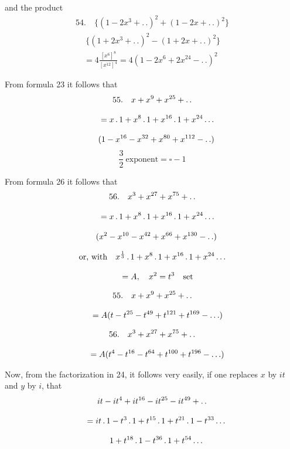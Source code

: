 and the product
\[
\begin{gathered}
54.\quad{}
\{(1-2x^3+ .\,. )^2+(1-2x+ .\,. )^2\}\\[8pt]\quad{}\ \{(1+2x^3+ .\,. )^2-(1+2x+ .\,. )^2\}\\[8pt]
\quad=4\frac{[x^6]^8}{[x^{12}]^4}=4(1-2x^6+2x^{24}- .\,. )^2
\end{gathered}
\]


From formula 23 it follows that
\[
\begin{gathered}55.\quad{}
x+x^9+x^{25}+ .\,. \\[8pt]\quad{}=x\,.\,1+x^8\,.\,1+x^{16}\,.\,1+x^{24}\mathinner{.\,.\,.}\\[8pt]\quad{}(1-x^{16}-x^{32}+x^{80}+x^{112}- .\,. )\end{gathered}
\]
\[
\frac32\ \text{exponent}=\square-1
\]


From formula 26 it follows that
\[
\begin{gathered}56.\quad{}
x^3+x^{27}+x^{75}+ .\,. \\[8pt]\quad{}=x\,.\,1+x^8\,.\,1+x^{16}\,.\,1+x^{24}\mathinner{.\,.\,.}\\[8pt]\quad{}(x^2-x^{10}-x^{42}+x^{66}+x^{130}- .\,. )\end{gathered}
\]

\[
\begin{gathered}\text{or, with}\quad x^{\frac13}\,.\,1+x^8\,.\,1+x^{16}\,.\,1+x^{24}\mathinner{.\,.\,.}\\[8pt]\quad{}=A,\quad x^2=t^3\quad\text{set}\end{gathered}
\]

\[
\begin{gathered}55.\quad{}
x+x^9+x^{25}+ .\,. \\[8pt]\quad{}=A(t-t^{25}-t^{49}+t^{121}+t^{169}-\mathinner{.\,.\,.})\end{gathered}
\]

\[
\begin{gathered}56.\quad{}
x^3+x^{27}+x^{75}+ .\,. \\[8pt]\quad{}=A(t^4-t^{16}-t^{64}+t^{100}+t^{196}-\mathinner{.\,.\,.})\end{gathered}
\]


Now, from the factorization in 24, it follows very easily, if one replaces \(x\) by \(it\)
and \(y\) by \(i\), that
\[
\begin{gathered}
it-it^4+it^{16}-it^{25}-it^{49}+ .\,.\\[8pt]
\quad=it\,.\,1-t^3\,.\,1+t^{15}\,.\,1+t^{21}\,.\,1-t^{33}\mathinner{.\,.\,.}\\[8pt]\quad{}1+t^{18}\,.\,1-t^{36}\,.\,1+t^{54}\mathinner{.\,.\,.}
\end{gathered}
\]


